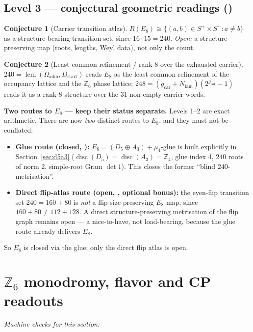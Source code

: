\documentclass[11pt,a4paper]{article}
\newcommand{\gcar}{g_{\mathrm{car}}}
\newcommand{\Nfam}{N_{\mathrm{fam}}}
\newcommand{\Oadm}{\Omega_{\mathrm{adm}}}
\newcommand{\Dstart}{D_{\mathrm{start}}}
\theoremstyle{definition}
\newtheorem{conjecture}{Conjecture}
\begin{document}
\subsection{Level 3 --- conjectural geometric readings (\mC)}
\begin{conjecture}[Carrier transition atlas]
$R(E_8)\cong\{(a,b)\in S^+\times S^+: a\neq b\}$ as a structure-bearing transition set, since
$16\cdot15=240$. \emph{Open:} a structure-preserving map (roots, lengths, Weyl data), not only the
count.
\end{conjecture}
\begin{conjecture}[Least common refinement / rank-8 over the exhausted carrier]
$240=\operatorname{lcm}(\Oadm,\Dstart)$ reads $E_8$ as the least common refinement of the occupancy
lattice and the $\mathbb Z_6$ phase lattice; $248=(\gcar+\Nfam)(2^{\gcar}-1)$ reads it as a rank-$8$
structure over the $31$ non-empty carrier words.
\end{conjecture}
\par\smallskip\noindent\textbf{Two routes to $E_8$ --- keep their status separate.}
Levels 1--2 are exact arithmetic. There are now \emph{two} distinct routes to $E_8$, and they must not
be conflated:
\begin{itemize}
\item \textbf{Glue route (closed, \mE):} $E_8=(D_5\oplus A_3)+\mu_4$-glue is built explicitly in
Section~\ref{sec:d5a3} ($\operatorname{disc}(D_5)=\operatorname{disc}(A_3)=\mathbb Z_4$, glue index $4$,
$240$ roots of norm $2$, simple-root Gram $\det 1$). This closes the former ``blind $240$-metrisation''.
\item \textbf{Direct flip-atlas route (open, \mO, optional bonus):} the even-flip transition set
$240=160+80$ is \emph{not} a flip-size-preserving $E_8$ map, since $160+80\neq 112+128$. A direct
structure-preserving metrisation of the flip graph remains open --- a nice-to-have, not load-bearing,
because the glue route already delivers $E_8$.
\end{itemize}
So $E_8$ is closed via the glue; only the direct flip atlas is open.
\par\smallskip

\section{$\mathbb Z_6$ monodromy, flavor and CP readouts}
\noindent\emph{Machine checks for this section:} 
\end{document}
